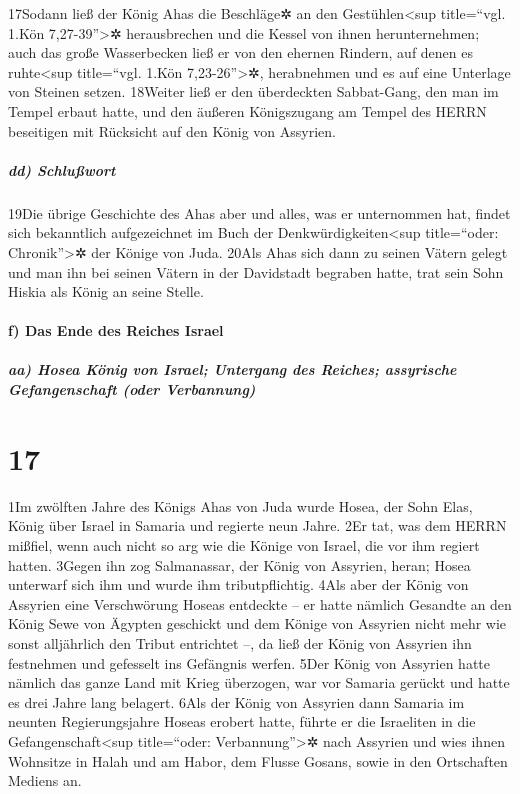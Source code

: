 17Sodann ließ der König Ahas die Beschläge✲ an den
Gestühlen\textless sup title=``vgl. 1.Kön 7,27-39''\textgreater✲
herausbrechen und die Kessel von ihnen herunternehmen; auch das große
Wasserbecken ließ er von den ehernen Rindern, auf denen es
ruhte\textless sup title=``vgl. 1.Kön 7,23-26''\textgreater✲,
herabnehmen und es auf eine Unterlage von Steinen setzen. 18Weiter ließ
er den überdeckten Sabbat-Gang, den man im Tempel erbaut hatte, und den
äußeren Königszugang am Tempel des HERRN beseitigen mit Rücksicht auf
den König von Assyrien.

\hypertarget{dd-schluuxdfwort}{%
\subparagraph{dd) Schlußwort}\label{dd-schluuxdfwort}}

19Die übrige Geschichte des Ahas aber und alles, was er unternommen hat,
findet sich bekanntlich aufgezeichnet im Buch der
Denkwürdigkeiten\textless sup title=``oder: Chronik''\textgreater✲ der
Könige von Juda. 20Als Ahas sich dann zu seinen Vätern gelegt und man
ihn bei seinen Vätern in der Davidstadt begraben hatte, trat sein Sohn
Hiskia als König an seine Stelle.

\hypertarget{f-das-ende-des-reiches-israel}{%
\paragraph{f) Das Ende des Reiches
Israel}\label{f-das-ende-des-reiches-israel}}

\hypertarget{aa-hosea-kuxf6nig-von-israel-untergang-des-reiches-assyrische-gefangenschaft-oder-verbannung}{%
\subparagraph{aa) Hosea König von Israel; Untergang des Reiches;
assyrische Gefangenschaft (oder
Verbannung)}\label{aa-hosea-kuxf6nig-von-israel-untergang-des-reiches-assyrische-gefangenschaft-oder-verbannung}}

\hypertarget{section-16}{%
\section{17}\label{section-16}}

1Im zwölften Jahre des Königs Ahas von Juda wurde Hosea, der Sohn Elas,
König über Israel in Samaria und regierte neun Jahre. 2Er tat, was dem
HERRN mißfiel, wenn auch nicht so arg wie die Könige von Israel, die vor
ihm regiert hatten. 3Gegen ihn zog Salmanassar, der König von Assyrien,
heran; Hosea unterwarf sich ihm und wurde ihm tributpflichtig. 4Als aber
der König von Assyrien eine Verschwörung Hoseas entdeckte -- er hatte
nämlich Gesandte an den König Sewe von Ägypten geschickt und dem Könige
von Assyrien nicht mehr wie sonst alljährlich den Tribut entrichtet --,
da ließ der König von Assyrien ihn festnehmen und gefesselt ins
Gefängnis werfen. 5Der König von Assyrien hatte nämlich das ganze Land
mit Krieg überzogen, war vor Samaria gerückt und hatte es drei Jahre
lang belagert. 6Als der König von Assyrien dann Samaria im neunten
Regierungsjahre Hoseas erobert hatte, führte er die Israeliten in die
Gefangenschaft\textless sup title=``oder: Verbannung''\textgreater✲ nach
Assyrien und wies ihnen Wohnsitze in Halah und am Habor, dem Flusse
Gosans, sowie in den Ortschaften Mediens an.

